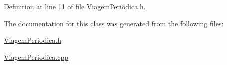 Definition at line 11 of file Viagem\+Periodica.\+h.



The documentation for this class was generated from the following files\+:\begin{DoxyCompactItemize}
\item 
\hyperlink{_viagem_periodica_8h}{Viagem\+Periodica.\+h}\item 
\hyperlink{_viagem_periodica_8cpp}{Viagem\+Periodica.\+cpp}\end{DoxyCompactItemize}
